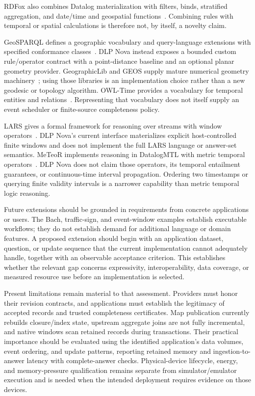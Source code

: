 \documentclass{article}
\begin{document}
RDFox also combines Datalog materialization with filters, binds, stratified
aggregation, and date/time and geospatial functions~\cite{rdfoxreasoning,rdfoxquerying}.
Combining rules with temporal or spatial calculations is therefore not, by
itself, a novelty claim.

GeoSPARQL defines a geographic vocabulary and query-language extensions with
specified conformance classes~\cite{geosparql11}. DLP Nova instead exposes a
bounded custom rule/operator contract with a point-distance baseline and an
optional planar geometry provider. GeographicLib and GEOS supply mature
numerical geometry machinery~\cite{karney2013,geos}; using those libraries is
an implementation choice rather than a new geodesic or topology algorithm.
OWL-Time provides a vocabulary for temporal entities and
relations~\cite{owltime2017}. Representing that vocabulary does not itself
supply an event scheduler or finite-source completeness policy.

LARS gives a formal framework for reasoning over streams with window
operators~\cite{lars2018}. DLP Nova's current interface materializes explicit
host-controlled finite windows and does not implement the full LARS language
or answer-set semantics. MeTeoR implements reasoning in DatalogMTL with metric
temporal operators~\cite{meteor2025}. DLP Nova does not claim those operators,
its temporal entailment guarantees, or continuous-time interval propagation.
Ordering two timestamps or querying finite validity intervals is a narrower
capability than metric temporal logic reasoning.

Future extensions should be grounded in requirements from concrete applications
or users. The Bach, traffic-sign, and event-window examples establish executable
workflows; they do not establish demand for additional language or domain
features. A proposed extension should begin with an application dataset,
question, or update sequence that the current implementation cannot adequately
handle, together with an observable acceptance criterion. This establishes
whether the relevant gap concerns expressivity, interoperability, data coverage,
or measured resource use before an implementation is selected.

Present limitations remain material to that assessment. Providers must honor
their revision contracts, and applications must establish the legitimacy of
accepted records and trusted completeness certificates. Map publication
currently rebuilds closure/index state, upstream aggregate joins are not fully
incremental, and native windows scan retained records during transactions.
Their practical importance should be evaluated using the identified
application's data volumes, event ordering, and update patterns, reporting
retained memory and ingestion-to-answer latency with complete-answer checks.
Physical-device lifecycle, energy, and memory-pressure qualification remains
separate from simulator/emulator execution and is needed when the intended
deployment requires evidence on those devices.
\end{document}
